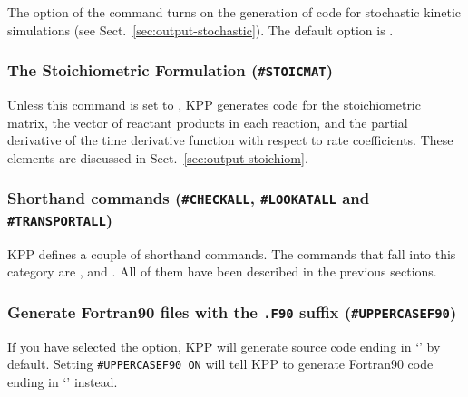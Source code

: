 \documentclass[twoside]{article}
\begin{document}
The option  of the  command turns on the
generation of code for stochastic kinetic simulations (see
Sect.~\ref{sec:output-stochastic}).  The default option is .

\subsubsection{The Stoichiometric Formulation ({\tt\#STOICMAT})}
\label{sec:command-stoicmat}

Unless this command is set to , KPP generates code for the
stoichiometric matrix, the vector of reactant products in each reaction,
and the partial derivative of the time derivative function with respect
to rate coefficients. These elements are discussed in
Sect.~\ref{sec:output-stoichiom}.

\subsubsection{Shorthand commands ({\tt\#CHECKALL}, {\tt\#LOOKATALL} and
  {\tt\#TRANSPORTALL})}
\label{sec:command-shorthand}

KPP defines a couple of shorthand commands. The commands that fall into
this category are ,  and
. All of them have been described in the previous
sections.

\subsubsection{Generate Fortran90 files with the {\tt .F90} suffix
  ({\tt\#UPPERCASEF90})}
\label{sec:command-uppercasef90}

If you have selected the  option, KPP will
generate source code ending in `' by default. Setting
{\tt\#UPPERCASEF90 ON} will tell KPP to generate Fortran90 code ending
in `' instead.

\end{document}
